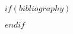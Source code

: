 \documentclass{aa}
\begin{document}
%
%

$if(bibliography)$


$endif$

%
%
%
%
%
%
%
%
%
\end{document}
